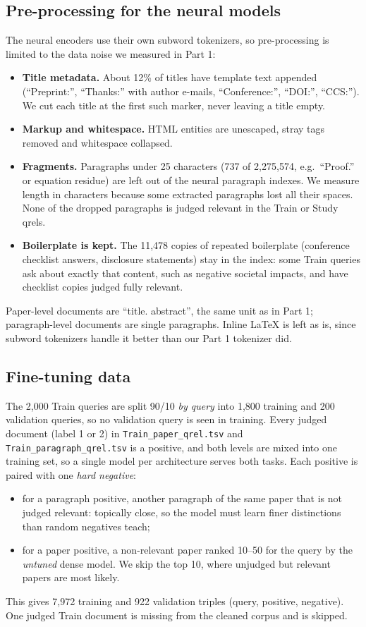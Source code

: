 \documentclass[sigconf,nonacm]{acmart}
\begin{document}
\subsection{Pre-processing for the neural models}
The neural encoders use their own subword tokenizers, so pre-processing is limited to the data noise we measured in Part 1:
\begin{itemize}
\item \textbf{Title metadata.} About 12\% of titles have template text appended (``Preprint:'', ``Thanks:'' with author e-mails, ``Conference:'', ``DOI:'', ``CCS:''). We cut each title at the first such marker, never leaving a title empty.
\item \textbf{Markup and whitespace.} HTML entities are unescaped, stray tags removed and whitespace collapsed.
\item \textbf{Fragments.} Paragraphs under 25 characters (737 of 2{,}275{,}574, e.g.\ ``Proof.'' or equation residue) are left out of the neural paragraph indexes. We measure length in characters because some extracted paragraphs lost all their spaces. None of the dropped paragraphs is judged relevant in the Train or Study qrels.
\item \textbf{Boilerplate is kept.} The 11{,}478 copies of repeated boilerplate (conference checklist answers, disclosure statements) stay in the index: some Train queries ask about exactly that content, such as negative societal impacts, and have checklist copies judged fully relevant.
\end{itemize}
Paper-level documents are ``title. abstract'', the same unit as in Part 1; paragraph-level documents are single paragraphs. Inline LaTeX is left as is, since subword tokenizers handle it better than our Part 1 tokenizer did.

\subsection{Fine-tuning data}
The 2{,}000 Train queries are split 90/10 \emph{by query} into 1{,}800 training and 200 validation queries, so no validation query is seen in training. Every judged document (label 1 or 2) in \texttt{Train\_paper\_qrel.tsv} and \texttt{Train\_paragraph\_qrel.tsv} is a positive, and both levels are mixed into one training set, so a single model per architecture serves both tasks. Each positive is paired with one \emph{hard negative}:
\begin{itemize}
\item for a paragraph positive, another paragraph of the same paper that is not judged relevant: topically close, so the model must learn finer distinctions than random negatives teach;
\item for a paper positive, a non-relevant paper ranked 10--50 for the query by the \emph{untuned} dense model. We skip the top 10, where unjudged but relevant papers are most likely.
\end{itemize}
This gives 7{,}972 training and 922 validation triples (query, positive, negative). One judged Train document is missing from the cleaned corpus and is skipped.
\end{document}

